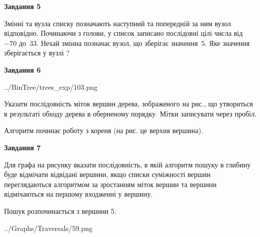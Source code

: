 \documentclass[12pt, ukrainian]{article}
\begin{document}
{\begin {large}
{\begin {center}\textbf{Завдання 5}\end {center}}\par
Змінні  та  вузла списку позначають наступний та попередній за ним вузол відповідно. Починаючи з голови, у список записано послідовні цілі числа від~$-70$ до~$33$. Нехай змінна  позначає вузол, що зберігає значення~$5$.
Яке значення зберігається у вузлі  ?\par
\newpage

{\begin {center}\textbf{Завдання 6}\end {center}}\par

\begin{center}
	{../BinTree/trees_exp/103.png}
\end{center}
Указати послідовність міток вершин дерева, зображеного на рис., що утвориться в результаті обходу дерева в оберненому порядку. Мітки записувати через пробіл.\par Алгоритм починає роботу з кореня (на рис. це верхня вершина).\par
\newpage

{\begin {center}\textbf{Завдання 7}\end {center}}\par
Для графа на рисунку вказати послідовність, в якій алгоритм пошуку в глибину буде відмічати відвідані вершини, якщо списки суміжності вершин переглядаються алгоритмом за зростанням міток вершин та вершини відмічаються на першому вход\-женні у вершину.\par
Пошук розпочинається з вершини 5.\par

\begin{center}
	{../Graphs/Traversals/59.png}
\end{center}\par
\newpage


\end{large}}
\end{document}
